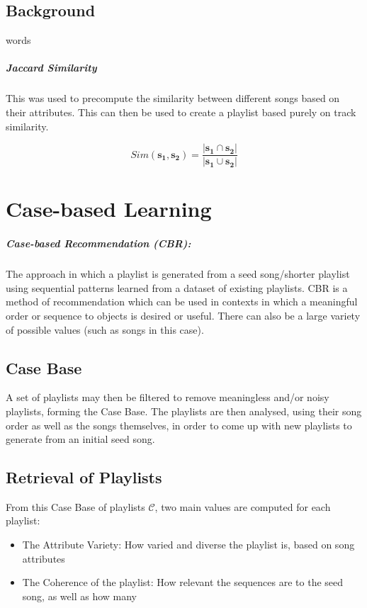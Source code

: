 \documentclass[a4paper, 12pt]{report}
\begin{document}
\section{Background}
words

\paragraph{Jaccard Similarity}
This was used to precompute the similarity between different songs based on their attributes. 
This can then be used to create a playlist based purely on track similarity.

\[Sim(\bm{s_1}, \bm{s_2}) = \frac{|\bm{s_1} \cap \bm{s_2}|}{|\bm{s_1} \cup \bm{s_2}|}\]


\chapter{Case-based Learning}
\paragraph{Case-based Recommendation (CBR):}
The approach in which a playlist is generated from a seed song/shorter playlist using sequential patterns 
learned from a dataset of existing playlists.
CBR is a method of recommendation which can be used in contexts in which a meaningful order or sequence to objects is desired or useful.
There can also be a large variety of possible values (such as songs in this case).

\section{Case Base}
A set of playlists may then be filtered to remove meaningless and/or noisy playlists, forming the Case Base.
The playlists are then analysed, using their song order as well as the songs themselves, in order to 
come up with new playlists to generate from an initial seed song.

\section{Retrieval of Playlists}
From this Case Base of playlists \(\mathcal{C}\), two main values are computed for each playlist:
\begin{itemize}
    \item The Attribute Variety: How varied and diverse the playlist is, based on song attributes
    \item The Coherence of the playlist: How relevant the sequences are to the seed song, as well as how many
\end{itemize}
\end{document}
